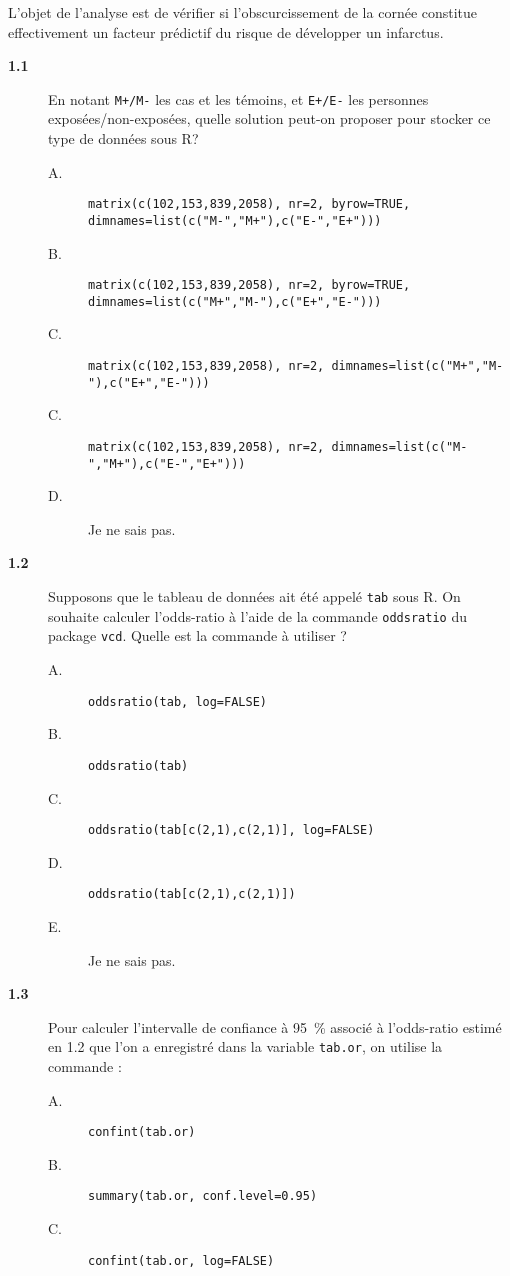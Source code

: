 \documentclass[11pt]{report}
\theoremstyle{definition}
\newcommand{\R}{\textsf{R}\xspace}
\begin{document}
L'objet de l'analyse est de vérifier si l'obscurcissement de la cornée constitue
effectivement un facteur prédictif du risque de développer un infarctus.
\begin{description}
\item[\bf 1.1]  En notant \texttt{M+/M-} les cas et
  les témoins, et \texttt{E+/E-} les personnes exposées/non-exposées, quelle
  solution peut-on proposer pour stocker ce type de données sous \R ?
  \begin{description}
  \item[A.] \verb|matrix(c(102,153,839,2058), nr=2, byrow=TRUE, dimnames=list(c("M-","M+"),c("E-","E+")))|
  \item[B.] \verb|matrix(c(102,153,839,2058), nr=2, byrow=TRUE, dimnames=list(c("M+","M-"),c("E+","E-")))|
  \item[C.] \verb|matrix(c(102,153,839,2058), nr=2, dimnames=list(c("M+","M-"),c("E+","E-")))|
  \item[C.] \verb|matrix(c(102,153,839,2058), nr=2, dimnames=list(c("M-","M+"),c("E-","E+")))|
  \item[D.] Je ne sais pas.
  \end{description}
\item[\bf 1.2]  Supposons que le tableau de données
  ait été appelé \texttt{tab} sous \R. On souhaite calculer l'odds-ratio à
  l'aide de la commande \texttt{oddsratio} du package \texttt{vcd}. Quelle
  est la commande à utiliser ?
  \begin{description}
  \item[A.] \verb|oddsratio(tab, log=FALSE)|
  \item[B.] \verb|oddsratio(tab)|
  \item[C.] \verb|oddsratio(tab[c(2,1),c(2,1)], log=FALSE)|
  \item[D.] \verb|oddsratio(tab[c(2,1),c(2,1)])|
  \item[E.] Je ne sais pas.
  \end{description}
\item[\bf 1.3]  Pour calculer l'intervalle de
  confiance à 95~\% associé à l'odds-ratio estimé en 1.2 que l'on a
  enregistré dans la variable \texttt{tab.or}, on utilise la commande :
  \begin{description}
  \item[A.] \verb|confint(tab.or)|
  \item[B.] \verb|summary(tab.or, conf.level=0.95)|
  \item[C.] \verb|confint(tab.or, log=FALSE)|

\end{description}
\end{description}
\end{document}
